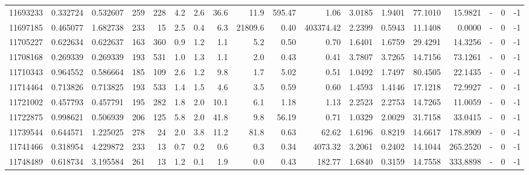 \begin{tabular}{rrrrrrrrrrrrrrrlrr}
  11693233 & 0.332724 &   0.532607 &  259 &  228 &      4.2 &      2.6 &    36.6 &     11.9 &     595.47 &        1.06 &  3.0185 &  1.9401 &   77.1010 &   15.9821 &             - &        0 &         -1 \\
  11697185 & 0.465077 &   1.682738 &  233 &   15 &      2.5 &      0.4 &     6.3 &  21809.6 &       0.40 &   403374.42 &  2.2399 &  0.5943 &   11.1408 &    0.0000 &             - &        0 &         -1 \\
  11705227 & 0.622634 &   0.622637 &  163 &  360 &      0.9 &      1.2 &     1.1 &      5.2 &       0.50 &        0.70 &  1.6401 &  1.6759 &   29.4291 &   14.3256 &             - &        0 &         -1 \\
  11708168 & 0.269339 &   0.269339 &  193 &  531 &      1.0 &      1.3 &     1.1 &      2.0 &       0.43 &        0.41 &  3.7807 &  3.7265 &   14.7156 &   73.1261 &             - &        0 &         -1 \\
  11710343 & 0.964552 &   0.586664 &  185 &  109 &      2.6 &      1.2 &     9.8 &      1.7 &       5.02 &        0.51 &  1.0492 &  1.7497 &   80.4505 &   22.1435 &             - &        0 &         -1 \\
  11714464 & 0.713826 &   0.713825 &  193 &  533 &      1.4 &      1.5 &     4.6 &      3.5 &       0.59 &        0.60 &  1.4593 &  1.4146 &   17.1218 &   72.9927 &             - &        0 &         -1 \\
  11721002 & 0.457793 &   0.457791 &  195 &  282 &      1.8 &      2.0 &    10.1 &      6.1 &       1.18 &        1.13 &  2.2523 &  2.2753 &   14.7265 &   11.0059 &             - &        0 &         -1 \\
  11722875 & 0.998621 &   0.506939 &  206 &  125 &      5.8 &      2.0 &    41.8 &      9.8 &      56.19 &        0.71 &  1.0329 &  2.0029 &   31.7158 &   33.0415 &             - &        0 &         -1 \\
  11739544 & 0.644571 &   1.225025 &  278 &   24 &      2.0 &      3.8 &    11.2 &     81.8 &       0.63 &       62.62 &  1.6196 &  0.8219 &   14.6617 &  178.8909 &             - &        0 &         -1 \\
  11741466 & 0.318954 &   4.229872 &  233 &   13 &      0.7 &      0.2 &     0.6 &      0.3 &       0.34 &     4073.32 &  3.2061 &  0.2402 &   14.1044 &  265.2520 &             - &        0 &         -1 \\
  11748489 & 0.618734 &   3.195584 &  261 &   13 &      1.2 &      0.1 &     1.9 &      0.0 &       0.43 &      182.77 &  1.6840 &  0.3159 &   14.7558 &  333.8898 &             - &        0 &         -1 \\

\end{tabular}

